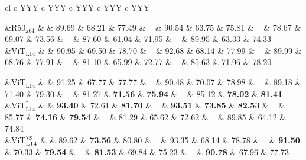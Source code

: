 \begin{table*}[bp]
\begin{tabularx}{\textwidth}{cl c YYY c YYY c YYY c YYY c YYY}
\parbox[t]{1mm}{}
&{R50$_{\text{x64}}$} &  & 
89.69 & 68.21 & 77.49  & ~ &
90.54 & 63.75 & 75.81  & ~ &
78.67 & 69.07 & 73.56  & ~ &
\underline{87.60} & 61.04 & 71.95  & ~ &
89.95 & 63.33 & 74.33  \\



&{ViT$_{\text{L14}}$} &  & 
\underline{90.95} & 69.50 & \underline{78.70}  & ~ &
\underline{92.68} & 68.14 & \underline{77.99}  & ~ &
\underline{89.99} & 68.76 & 77.91  & ~ &
81.10 & \underline{65.99} & \underline{72.77}  & ~ &
\underline{85.63} & \underline{71.96} & \underline{78.20}  \\

 

&{ViT$_{\text{L14}}^\dag$} &  & 
91.25 & 67.77 & 77.77  & ~ &
90.48 & 70.07 & 78.98  & ~ &
89.18 & 71.40 & 79.30  & ~ &
81.27 & \textbf{71.56} & \textbf{75.94}  & ~ &
85.12 & \textbf{78.02} & \textbf{81.41}  \\

&{ViT$_{\text{L14}}^\ddag$} &  & 
\textbf{93.40} & 72.61 & \textbf{81.70}  & ~ &
\textbf{93.51} & \textbf{73.85} & \textbf{82.53}  & ~ &
85.77 & \textbf{74.16} & \textbf{79.54}  & ~ &
81.29 & 65.62 & 72.62  & ~ &
89.85 & 64.12 & 74.84  \\

&{ViT$_{\text{L14}}^\S$} &  & 
89.62 & \textbf{73.56} & 80.80  & ~ &
93.35 & 68.14 & 78.78  & ~ &
\textbf{91.50} & 70.33 & \textbf{79.54}  & ~ &
\textbf{81.53} & 69.84 & 75.23  & ~ &
\textbf{90.78} & 67.96 & 77.73  \\


\end{tabularx}
\end{table*}
